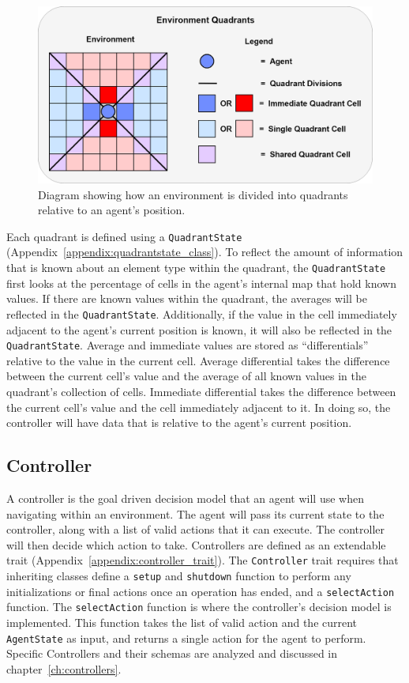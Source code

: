 \begin{figure}[H]
  \centering
  \includegraphics[width=1.0\columnwidth]{Figures/quadrants.png}
  \caption{Diagram showing how an environment is divided into quadrants relative to an agent's position.}
  \label{fig:quadrants}
\end{figure}

Each quadrant is defined using a \texttt{QuadrantState} (Appendix~\ref{appendix:quadrantstate_class}).
To reflect the amount of information that is known about an element type within the quadrant, the \texttt{QuadrantState} first looks at the percentage of cells in the agent's internal map that hold known values.
If there are known values within the quadrant, the averages will be reflected in the \texttt{QuadrantState}.
Additionally, if the value in the cell immediately adjacent to the agent's current position is known, it will also be reflected in the \texttt{QuadrantState}.
Average and immediate values are stored as ``differentials'' relative to the value in the current cell.
Average differential takes the difference between the current cell's value and the average of all known values in the quadrant's collection of cells.
Immediate differential takes the difference between the current cell's value and the cell immediately adjacent to it.
In doing so, the controller will have data that is relative to the agent's current position.


\subsection{Controller} \label{subsec:controller}
A controller is the goal driven decision model that an agent will use when navigating within an environment.
The agent will pass its current state to the controller, along with a list of valid actions that it can execute.
The controller will then decide which action to take.
Controllers are defined as an extendable trait (Appendix~\ref{appendix:controller_trait}).
The \texttt{Controller} trait requires that inheriting classes define a \texttt{setup} and \texttt{shutdown} function to perform any initializations or final actions once an operation has ended, and a \texttt{selectAction} function.
The \texttt{selectAction} function is where the controller's decision model is implemented.
This function takes the list of valid action and the current \texttt{AgentState} as input, and returns a single action for the agent to perform.
Specific Controllers and their schemas are analyzed and discussed in chapter~\ref{ch:controllers}.




